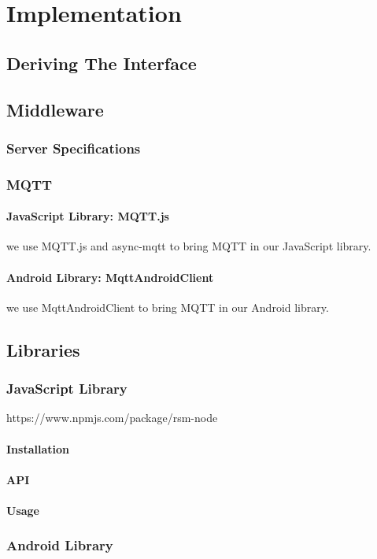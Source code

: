\chapter{Implementation}
\label{ch:implementation}
\section{Deriving The Interface}

\section{Middleware}
\subsection{Server Specifications}
\subsection{MQTT}
\subsubsection{JavaScript Library: MQTT.js}
we use MQTT.js and async-mqtt to bring MQTT in our JavaScript library.
\subsubsection{Android Library: MqttAndroidClient}
we use MqttAndroidClient to bring MQTT in our Android library.

\section{Libraries}
\subsection{JavaScript Library}
https://www.npmjs.com/package/rsm-node

\subsubsection{Installation}
\subsubsection{API}
\subsubsection{Usage}
\subsection{Android Library}
